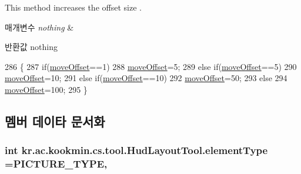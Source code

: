 This method increases the offset size . 


\begin{DoxyParams}{매개변수}
{\em nothing} & \\
\hline
\end{DoxyParams}
\begin{DoxyReturn}{반환값}
nothing 
\end{DoxyReturn}

\begin{DoxyCode}
286   \{
287     \textcolor{keywordflow}{if}(\hyperlink{classkr_1_1ac_1_1kookmin_1_1cs_1_1tool_1_1_hud_layout_tool_a9207f2feb57881dd1d60896e45408aa5}{moveOffset}==1)
288       \hyperlink{classkr_1_1ac_1_1kookmin_1_1cs_1_1tool_1_1_hud_layout_tool_a9207f2feb57881dd1d60896e45408aa5}{moveOffset}=5;
289     \textcolor{keywordflow}{else} \textcolor{keywordflow}{if}(\hyperlink{classkr_1_1ac_1_1kookmin_1_1cs_1_1tool_1_1_hud_layout_tool_a9207f2feb57881dd1d60896e45408aa5}{moveOffset}==5)
290       \hyperlink{classkr_1_1ac_1_1kookmin_1_1cs_1_1tool_1_1_hud_layout_tool_a9207f2feb57881dd1d60896e45408aa5}{moveOffset}=10;
291     \textcolor{keywordflow}{else} \textcolor{keywordflow}{if}(\hyperlink{classkr_1_1ac_1_1kookmin_1_1cs_1_1tool_1_1_hud_layout_tool_a9207f2feb57881dd1d60896e45408aa5}{moveOffset}==10)
292       \hyperlink{classkr_1_1ac_1_1kookmin_1_1cs_1_1tool_1_1_hud_layout_tool_a9207f2feb57881dd1d60896e45408aa5}{moveOffset}=50;
293     \textcolor{keywordflow}{else}
294       \hyperlink{classkr_1_1ac_1_1kookmin_1_1cs_1_1tool_1_1_hud_layout_tool_a9207f2feb57881dd1d60896e45408aa5}{moveOffset}=100;
295   \}
\end{DoxyCode}


\subsection{멤버 데이타 문서화}
\hypertarget{classkr_1_1ac_1_1kookmin_1_1cs_1_1tool_1_1_hud_layout_tool_a15ae154367e2b7529894488ef358f004}{}
\subsubsection[{element\+Type}]{\setlength{\rightskip}{0pt plus 5cm}int kr.\+ac.\+kookmin.\+cs.\+tool.\+Hud\+Layout\+Tool.\+element\+Type ={\bf P\+I\+C\+T\+U\+R\+E\+\_\+\+T\+Y\+P\+E}\hspace{0.3cm}{\ttfamily [static]}, {\ttfamily [private]}}\label{classkr_1_1ac_1_1kookmin_1_1cs_1_1tool_1_1_hud_layout_tool_a15ae154367e2b7529894488ef358f004}
\hypertarget{classkr_1_1ac_1_1kookmin_1_1cs_1_1tool_1_1_hud_layout_tool_a92b0ab831e8b62aaebc0974947958349}{}
